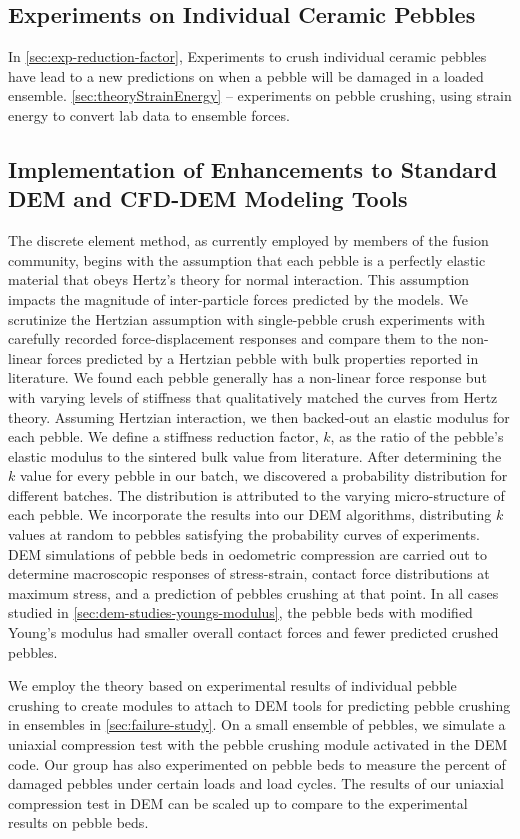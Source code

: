 \subsection*{Experiments on Individual Ceramic Pebbles}
In \cref{sec:exp-reduction-factor}, Experiments to crush individual ceramic pebbles have lead to a new predictions on when a pebble will be damaged in a loaded ensemble. \cref{sec:theoryStrainEnergy} -- experiments on pebble crushing, using strain energy to convert lab data to ensemble forces.

\subsection*{Implementation of Enhancements to Standard DEM and CFD-DEM Modeling Tools}
The discrete element method, as currently employed by members of the fusion community, begins with the assumption that each pebble is a perfectly elastic material that obeys Hertz’s theory for normal interaction. This assumption impacts the magnitude of inter-particle forces predicted by the models. We scrutinize the Hertzian assumption with single-pebble crush experiments with carefully recorded force-displacement responses and compare them to the non-linear forces predicted by a Hertzian pebble with bulk properties reported in literature. We found each pebble generally has a non-linear force response but with varying levels of stiffness that qualitatively matched the curves from Hertz theory. Assuming Hertzian interaction, we then backed-out an elastic modulus for each pebble. We define a stiffness reduction factor, $k$, as the ratio of the pebble's elastic modulus to the sintered bulk value from literature. After determining the $k$ value for every pebble in our batch, we discovered a probability distribution for different batches. The distribution is attributed to the varying micro-structure of each pebble. We incorporate the results into our DEM algorithms, distributing $k$ values at random to pebbles satisfying the probability curves of experiments. DEM simulations of pebble beds in oedometric compression are carried out to determine macroscopic responses of stress-strain, contact force distributions at maximum stress, and a prediction of pebbles crushing at that point. In all cases studied in \cref{sec:dem-studies-youngs-modulus}, the pebble beds with modified Young's modulus had smaller overall contact forces and fewer predicted crushed pebbles. 

We employ the theory based on experimental results of individual pebble crushing to create modules to attach to DEM tools for predicting pebble crushing in ensembles in \cref{sec:failure-study}. On a small ensemble of pebbles, we simulate a uniaxial compression test with the pebble crushing module activated in the DEM code. Our group has also experimented on pebble beds to measure the percent of damaged pebbles under certain loads and load cycles. The results of our uniaxial compression test in DEM can be scaled up to compare to the experimental results on pebble beds.

